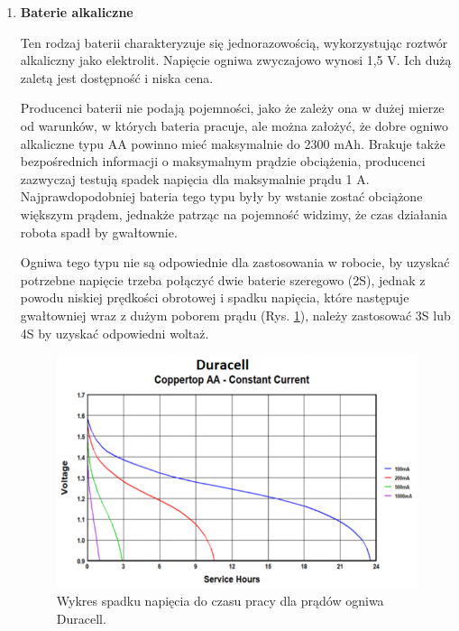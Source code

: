 \documentclass{report}
\begin{document}
\begin{enumerate}[label=(\Alph*)]
    \item \textbf{Baterie alkaliczne}

    Ten rodzaj baterii charakteryzuje się jednorazowością, wykorzystując roztwór alkaliczny jako elektrolit. Napięcie ogniwa zwyczajowo wynosi 1,5 V. Ich dużą zaletą jest dostępność i niska cena.
    
    Producenci baterii nie podają pojemności, jako że zależy ona w dużej mierze od warunków, w których bateria pracuje, ale można założyć, że dobre ogniwo alkaliczne typu AA powinno mieć maksymalnie do 2300 mAh. Brakuje także bezpośrednich informacji o maksymalnym prądzie obciążenia, producenci zazwyczaj testują spadek napięcia dla maksymalnie prądu 1 A. Najprawdopodobniej bateria tego typu były by wstanie zostać obciążone większym prądem, jednakże patrząc na pojemność widzimy, że czas działania robota spadł by gwałtownie.
    
    Ogniwa tego typu nie są odpowiednie dla zastosowania w robocie, by uzyskać potrzebne napięcie trzeba połączyć dwie baterie szeregowo (2S), jednak z powodu niskiej prędkości obrotowej i spadku napięcia, które następuje gwałtowniej wraz z dużym poborem prądu (Rys. \ref{fig:duracell}), należy zastosować 3S lub 4S by uzyskać odpowiedni woltaż.
    
    \begin{figure}[H]
        \centering
        \includegraphics{src/cells_charts/Duracell discharge.png}
        \caption{Wykres spadku napięcia do czasu pracy dla prądów ogniwa Duracell. \cite{DuracellChart}}
        \label{fig:duracell}
    \end{figure}


\end{enumerate}
\end{document}
